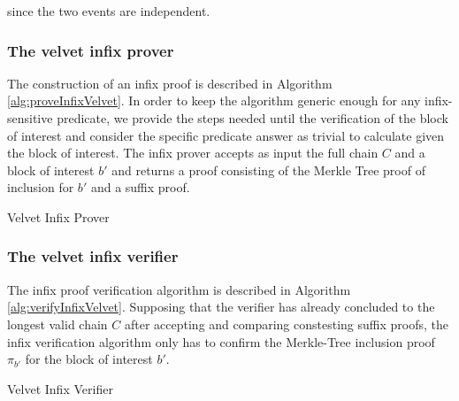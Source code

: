 \documentclass[10pt,a4paper]{article}
\theoremstyle{plain}
\theoremstyle{definition}
\theoremstyle{lemma}
\theoremstyle{corollary}
\begin{document}
since the two events are independent.

\subsubsection*{The velvet infix prover}
The construction of an infix proof is described in Algorithm \ref{alg:proveInfixVelvet}. In order
to keep the algorithm generic enough for any infix-sensitive predicate, we provide the steps
needed until the verification of the block of interest and consider the specific predicate answer
as trivial to calculate given the block of interest. The infix prover accepts as input the full
chain $C$ and a block of interest $b'$ and returns a proof consisting of the Merkle Tree proof
of inclusion for $b'$ and a suffix proof.
\vspace{4mm}

\begin{algorithm}[H]
\SetAlgoNoLine
\DontPrintSemicolon
{}
 \caption{Velvet Infix Prover}
 \label{alg:proveInfixVelvet}
\end{algorithm}

\vspace{4mm}

\subsubsection*{The velvet infix verifier}
The infix proof verification algorithm is described in Algorithm \ref{alg:verifyInfixVelvet}.
Supposing that the verifier has already concluded to the longest valid chain $C$ after accepting
and comparing constesting suffix proofs, the infix verification algorithm only has to confirm
the Merkle-Tree inclusion proof $\pi_{b'}$ for the block of interest $b'$.

\vspace{4mm}

\begin{algorithm}[H]
\SetAlgoNoLine
\DontPrintSemicolon
{}
 \caption{Velvet Infix Verifier}
 \label{alg:verifyInfixVelvet}
\end{algorithm}

\vspace{4mm}

\end{document}
